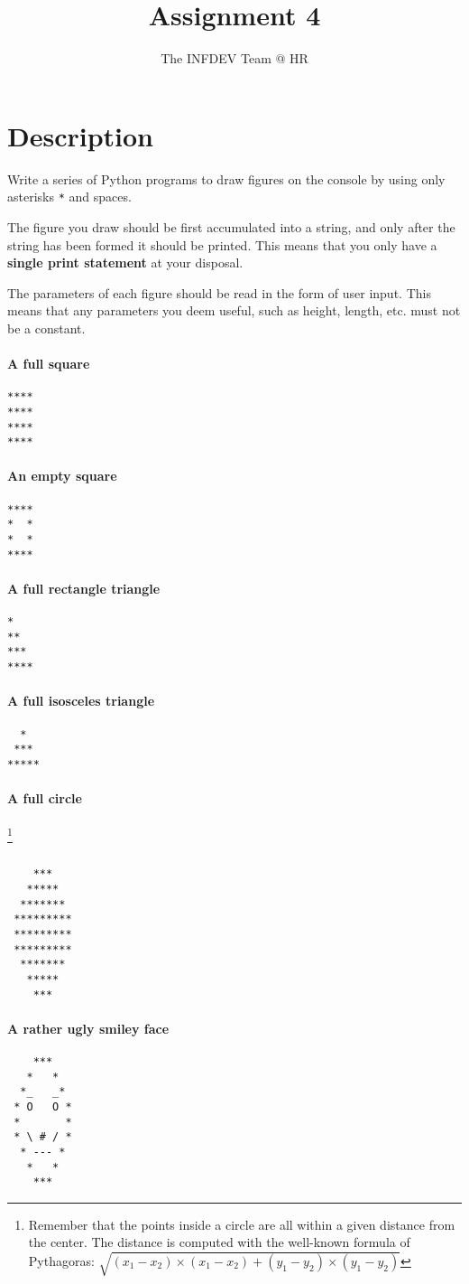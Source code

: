 \documentclass[10pt,a4paper,final]{article}
\author{The INFDEV Team @ HR}
\title{Assignment 4}
\begin{document}
\section{Description}
Write a series of Python programs to draw figures on the console by using only asterisks \texttt{*} and spaces. 

The figure you draw should be first accumulated into a string, and only after the string has been formed it should be printed. This means that you only have a \textbf{single print statement} at your disposal.

The parameters of each figure should be read in the form of user input. This means that any parameters you deem useful, such as height, length, etc. must not be a constant.


\paragraph*{A full square}
\begin{lstlisting}
****
****
****
****
\end{lstlisting}

\paragraph*{An empty square}
\begin{lstlisting}
****
*  *
*  *
****
\end{lstlisting}

\paragraph*{A full rectangle triangle}
\begin{lstlisting}
*
**
***
****
\end{lstlisting}

\paragraph*{A full isosceles triangle}
\begin{lstlisting}
  *
 ***
*****
\end{lstlisting}

\paragraph*{A full circle}\footnote{Remember that the points inside a circle are all within a given distance from the center. The distance is computed with the well-known formula of Pythagoras: $\sqrt{(x_1-x_2) \times (x_1-x_2) + (y_1-y_2) \times (y_1-y_2)}$}
\begin{lstlisting}

    ***
   *****
  *******
 *********
 *********
 *********
  *******
   *****
    ***
\end{lstlisting}

\paragraph*{A rather ugly smiley face}
\begin{lstlisting}
    ***
   *   *
  *_   _*
 * O   O *
 *       *
 * \ # / *
  * --- *
   *   *
    ***
\end{lstlisting}
\end{document}
